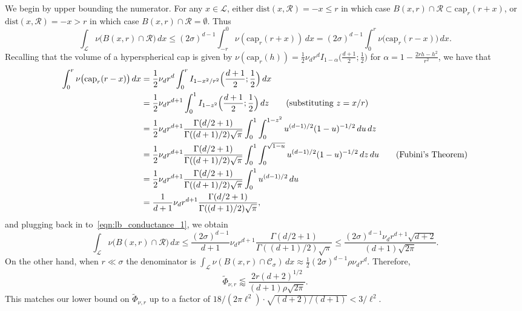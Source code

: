 \documentclass{report}
\newcommand{\1}{\mathbf{1}}
\newcommand{\mc}[1]{\mathcal{#1}}
\newcommand{\wt}[1]{\widetilde{#1}}
\newcommand{\dist}{\mathrm{dist}}
\theoremstyle{alden}
\theoremstyle{aldenthm}
\theoremstyle{definition}
\theoremstyle{remark}
\begin{document}
We begin by upper bounding the numerator. For any $x \in \mc{L}$, either $\dist(x,\mc{R}) = -x \leq r$ in which case $B(x,r) \cap \mc{R} \subset \mathrm{cap}_r(r + x)$, or $\dist(x,\mc{R}) = -x > r$ in which case $B(x,r) \cap \mc{R} = \emptyset$. Thus
\begin{equation}
\label{eqn:lb_conductance_1}
\int_{\mc{L}} \nu\bigl(B(x,r) \cap \mc{R}\bigr) \,dx \leq (2\sigma)^{d - 1} \int_{-r}^{0} \nu(\mathrm{cap}_r(r + x)) \,dx = (2\sigma)^{d - 1} \int_{0}^{r} \nu\bigl(\mathrm{cap}_r(r - x)\bigr) \,dx.
\end{equation}
Recalling that the volume of a hyperspherical cap is given by $\nu(\mathrm{cap}_r(h)) = \frac{1}{2}\nu_dr^dI_{1 - \alpha}\biggl(\frac{d + 1}{2};\frac{1}{2}\biggr)$ for $\alpha = 1 - \frac{2rh - h^2}{r^2}$, we have that
\begin{align*}
\int_{0}^{r} \nu\bigl(\mathrm{cap}_r(r - x)\bigr) \,dx & = \frac{1}{2}\nu_dr^d \int_{0}^{r} I_{1 - x^2/r^2}\Bigl(\frac{d + 1}{2}; \frac{1}{2}\Bigr) \,dx \\
& = \frac{1}{2}\nu_dr^{d + 1} \int_{0}^{1} I_{1 - z^2}\Bigl(\frac{d + 1}{2}; \frac{1}{2}\Bigr) \,dz \tag{substituting $z = x/r$}\\ 
& = \frac{1}{2}\nu_dr^{d + 1} \frac{\Gamma(d/2 + 1)}{\Gamma((d + 1)/2)\sqrt{\pi}} \int_{0}^{1} \int_{0}^{1 - z^2} u^{(d - 1)/2} (1 - u)^{-1/2} \,du \,dz \\
& = \frac{1}{2}\nu_dr^{d + 1} \frac{\Gamma(d/2 + 1)}{\Gamma((d + 1)/2)\sqrt{\pi}} \int_{0}^{1} \int_{0}^{\sqrt{1 - u}} u^{(d - 1)/2} (1 - u)^{-1/2} \,dz \,du \tag{Fubini's Theorem} \\
& = \frac{1}{2}\nu_dr^{d + 1} \frac{\Gamma(d/2 + 1)}{\Gamma((d + 1)/2)\sqrt{\pi}} \int_{0}^{1} u^{(d - 1)/2} \,du \\
& = \frac{1}{d + 1}\nu_dr^{d + 1} \frac{\Gamma(d/2 + 1)}{\Gamma((d + 1)/2)\sqrt{\pi}},
\end{align*}
and plugging back in to~\eqref{eqn:lb_conductance_1}, we obtain
\begin{equation*}
\int_{\mc{L}} \nu\bigl(B(x,r) \cap \mc{R}\bigr) \,dx \leq \frac{(2\sigma)^{d-1}}{d + 1}\nu_dr^{d + 1} \frac{\Gamma(d/2 + 1)}{\Gamma((d + 1)/2)\sqrt{\pi}} \leq \frac{(2\sigma)^{d - 1} \nu_d r^{d + 1}\sqrt{d + 2}}{(d + 1)\sqrt{2\pi}}.
\end{equation*}
On the other hand, when $r \ll \sigma$ the denominator is $\int_{\mc{L}}\nu(B(x,r) \cap \mc{C}_{\sigma}) \,dx \approx \frac{1}{2}(2\sigma)^{d - 1} \rho \nu_d r^d$. Therefore,
\begin{equation*}
\wt{\Phi}_{\nu,r} \lessapprox \frac{2r(d + 2)^{1/2}}{(d + 1)\rho \sqrt{2\pi}}.
\end{equation*}
This matches our lower bound on $\wt{\Phi}_{\nu,r}$ up to a factor of $18/(2\pi\ell^2) \cdot \sqrt{(d + 2)/(d + 1)} < 3/\ell^2.$
\end{document}
